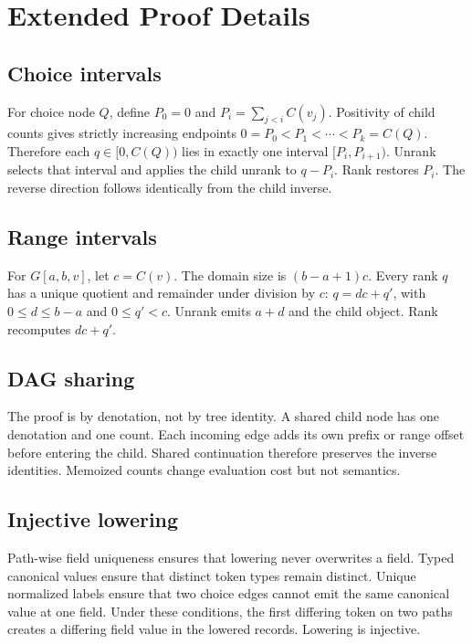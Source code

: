 \section{Extended Proof Details}
\subsection{Choice intervals}
For choice node \(Q\), define \(P_0=0\) and \(P_i=\sum_{j<i}C(v_j)\). Positivity of child counts gives strictly increasing endpoints
\(0=P_0<P_1<\cdots<P_k=C(Q)\). Therefore each \(q\in[0,C(Q))\) lies in exactly one interval \([P_i,P_{i+1})\). Unrank selects that interval and applies the child unrank to \(q-P_i\). Rank restores \(P_i\). The reverse direction follows identically from the child inverse.

\subsection{Range intervals}
For \(G[a,b,v]\), let \(c=C(v)\). The domain size is \((b-a+1)c\). Every rank \(q\) has a unique quotient and remainder under division by \(c\): \(q=dc+q'\), with \(0\le d\le b-a\) and \(0\le q'<c\). Unrank emits \(a+d\) and the child object. Rank recomputes \(dc+q'\).

\subsection{DAG sharing}
The proof is by denotation, not by tree identity. A shared child node has one denotation and one count. Each incoming edge adds its own prefix or range offset before entering the child. Shared continuation therefore preserves the inverse identities. Memoized counts change evaluation cost but not semantics.

\subsection{Injective lowering}
Path-wise field uniqueness ensures that lowering never overwrites a field. Typed canonical values ensure that distinct token types remain distinct. Unique normalized labels ensure that two choice edges cannot emit the same canonical value at one field. Under these conditions, the first differing token on two paths creates a differing field value in the lowered records. Lowering is injective.
